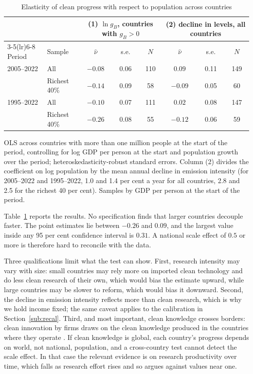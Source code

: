 \documentclass[11pt]{article}
\begin{document}
\begin{table}[h!]\centering
\begin{threeparttable}
\caption{Elasticity of clean progress with respect to population across countries}
\label{tab:nu}
\footnotesize
\begin{tabular}{llcccccc}
\toprule
 & & \multicolumn{3}{c}{(1) $\ln g_{B}$, countries with $g_B>0$} & \multicolumn{3}{c}{(2) decline in levels, all countries}\\
\cmidrule(lr){3-5}\cmidrule(lr){6-8}
Period & Sample & $\hat\nu$ & s.e. & $N$ & $\hat\nu$ & s.e. & $N$\\
\midrule
2005--2022 & All          & $-0.08$ & 0.06 & 110 & $0.09$  & 0.11 & 149\\
           & Richest 40\% & $-0.14$ & 0.09 & 58  & $-0.09$ & 0.05 & 60\\
1995--2022 & All          & $-0.10$ & 0.07 & 111 & $0.02$  & 0.08 & 147\\
           & Richest 40\% & $-0.26$ & 0.08 & 55  & $-0.12$ & 0.06 & 59\\
\bottomrule
\end{tabular}
\begin{tablenotes}\footnotesize
\item OLS across countries with more than one million people at the start of the period, controlling for
log GDP per person at the start and population growth over the period; heteroskedasticity-robust standard
errors. Column (2) divides the coefficient on log population by the mean annual decline in emission
intensity (for 2005--2022 and 1995--2022, 1.0 and 1.4 per cent a year for all countries, 2.8 and 2.5 for the
richest 40 per cent). Samples by
GDP per person at the start of the period.
\end{tablenotes}
\end{threeparttable}
\end{table}

Table~\ref{tab:nu} reports the results. No specification finds that larger countries decouple faster.
The point estimates lie between $-0.26$ and $0.09$, and the largest value inside any 95 per cent
confidence interval is $0.31$. A national scale effect of $0.5$ or more is therefore hard to reconcile with
the data.

Three qualifications limit what the test can show. First, research intensity may vary with size: small
countries may rely more on imported clean technology and do less clean research of their own, which would
bias the estimate upward, while large countries may be slower to reform, which would bias it downward.
Second, the decline in emission intensity reflects more than clean research, which is why we hold income
fixed; the same caveat applies to the calibration in Section~\ref{sub:recal}. Third, and most important,
clean knowledge crosses borders: clean innovation by firms draws on the clean knowledge produced in
the countries where they operate \citep{aghion2016carbon}. If clean knowledge is global, each country's
progress depends on world, not national, population, and a cross-country test cannot detect the scale
effect. In that case the relevant evidence is on research productivity over time, which falls as research
effort rises \citep{jones1995,bloom2020} and so argues against values near one.
\end{document}
